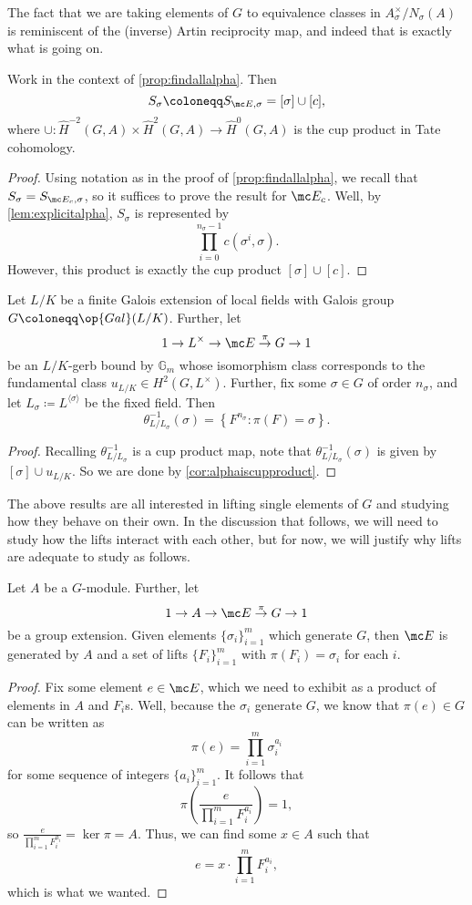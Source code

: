 \documentclass{article}
\numberwithin{equation}{section}
\begin{document}
The fact that we are taking elements of $ G$ to equivalence classes in $A_\sigma^\times/N_\sigma\left(A\right)$ is reminiscent of the (inverse) Artin reciprocity map, and indeed that is exactly what is going on.
\begin{cor} \label{cor:alphaiscupproduct}
	Work in the context of \autoref{prop:findallalpha}. Then
	\[S_\sigma\coloneqq S_{\mc E,\sigma}=[\sigma]\cup[c],\]
	where $\cup\colon\widehat H^{-2}( G,A)\times\widehat H^2( G,A)\to\widehat H^0( G,A)$ is the cup product in Tate cohomology.
\end{cor}
\begin{proof}
	Using notation as in the proof of \autoref{prop:findallalpha}, we recall that $S_\sigma=S_{\mc E_c,\sigma}$, so it suffices to prove the result for $\mc E_c$. Well, by \autoref{lem:explicitalpha}, $S_\sigma$ is represented by
	\[\prod_{i=0}^{n_\sigma-1}c\left(\sigma^i,\sigma\right).\]
	However, this product is exactly the cup product $[\sigma]\cup[c]$.
\end{proof}
\begin{cor}
	Let $L/K$ be a finite Galois extension of local fields with Galois group $ G\coloneqq\op{Gal}(L/K)$. Further, let
	\[1\to L^\times\to\mc E\stackrel\pi\to G\to1\]
	be an $L/K$-gerb bound by $\mathbb G_m$ whose isomorphism class corresponds to the fundamental class $u_{L/K}\in H^2( G,L^\times)$. Further, fix some $\sigma\in G$ of order $n_\sigma$, and let $L_\sigma\coloneqq L^{\langle\sigma\rangle}$ be the fixed field. Then
	\[\theta_{L/L_\sigma}^{-1}(\sigma)=\left\{F^{n_\sigma}:\pi(F)=\sigma\right\}.\]
\end{cor}
\begin{proof}
	Recalling $\theta_{L/L_\sigma}^{-1}$ is a cup product map, note that $\theta_{L/L_\sigma}^{-1}(\sigma)$ is given by $[\sigma]\cup u_{L/K}$. So we are done by \autoref{cor:alphaiscupproduct}.
\end{proof}
The above results are all interested in lifting single elements of $ G$ and studying how they behave on their own. In the discussion that follows, we will need to study how the lifts interact with each other, but for now, we will justify why lifts are adequate to study as follows.
\begin{proposition} \label{prop:liftsgenerate}
	Let $A$ be a $ G$-module. Further, let
	\[1\to A\to\mc E\stackrel\pi\to G\to1\]
	be a group extension. Given elements $\{\sigma_i\}_{i=1}^m$ which generate $ G$, then $\mc E$ is generated by $A$ and a set of lifts $\{F_i\}_{i=1}^m$ with $\pi(F_i)=\sigma_i$ for each $i$.
\end{proposition}
\begin{proof}
	Fix some element $e\in\mc E$, which we need to exhibit as a product of elements in $A$ and $F_i$s. Well, because the $\sigma_i$ generate $ G$, we know that $\pi(e)\in G$ can be written as
	\[\pi(e)=\prod_{i=1}^m\sigma_i^{a_i}\]
	for some sequence of integers $\{a_i\}_{i=1}^m$. It follows that
	\[\pi\left(\frac e{\prod_{i=1}^mF_i^{a_i}}\right)=1,\]
	so $\frac e{\prod_{i=1}^mF_i^{a_i}}=\ker\pi=A$. Thus, we can find some $x\in A$ such that
	\[e=x\cdot\prod_{i=1}^mF_i^{a_i},\]
	which is what we wanted.
\end{proof}
\end{document}
